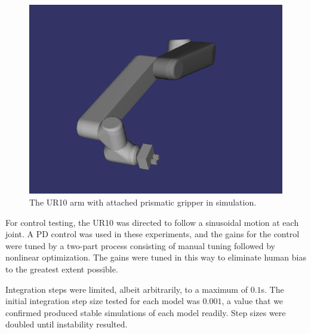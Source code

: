 \documentclass[conference]{IEEEtran}
\begin{document}
\begin{figure}[H]

\begin{center}
\includegraphics[scale=0.30]{UR10Arm.png}
\end{center}
\caption{The UR10 arm with attached prismatic gripper in simulation.\label{fig:UR10Arm}}
\end{figure}
For control testing, the UR10 was directed to follow a sinusoidal motion at each joint. %
A PD control was used in these experiments, and the gains for the control were tuned by a two-part process consisting of manual tuning followed by nonlinear optimization. The gains were tuned in this way to eliminate human bias to the greatest extent possible. 

Integration steps were limited, albeit arbitrarily, to a maximum of $0.1$s. The initial integration step size tested for each model was $0.001$, a value that we confirmed produced stable simulations of each model readily. Step sizes were doubled until instability resulted.%
\end{document}
